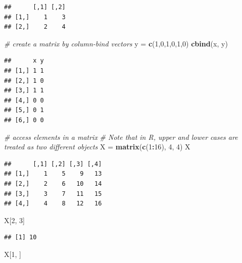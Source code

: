 \documentclass[
]{book}
\newenvironment{Shaded}{\begin{snugshade}}{\end{snugshade}}
\newcommand{\CommentTok}[1]{\textcolor[rgb]{0.56,0.35,0.01}{\textit{#1}}}
\newcommand{\DecValTok}[1]{\textcolor[rgb]{0.00,0.00,0.81}{#1}}
\newcommand{\KeywordTok}[1]{\textcolor[rgb]{0.13,0.29,0.53}{\textbf{#1}}}
\newcommand{\NormalTok}[1]{#1}
\newcommand{\OperatorTok}[1]{\textcolor[rgb]{0.81,0.36,0.00}{\textbf{#1}}}
\newcommand{\StringTok}[1]{\textcolor[rgb]{0.31,0.60,0.02}{#1}}
\begin{document}
\begin{verbatim}
##      [,1] [,2]
## [1,]    1    3
## [2,]    2    4
\end{verbatim}

\begin{Shaded}
\begin{Highlighting}[]
  \CommentTok{# create a matrix by column-bind vectors}
\NormalTok{  y =}\StringTok{ }\KeywordTok{c}\NormalTok{(}\DecValTok{1}\NormalTok{,}\DecValTok{0}\NormalTok{,}\DecValTok{1}\NormalTok{,}\DecValTok{0}\NormalTok{,}\DecValTok{1}\NormalTok{,}\DecValTok{0}\NormalTok{)}
  \KeywordTok{cbind}\NormalTok{(x, y)}
\end{Highlighting}
\end{Shaded}

\begin{verbatim}
##      x y
## [1,] 1 1
## [2,] 1 0
## [3,] 1 1
## [4,] 0 0
## [5,] 0 1
## [6,] 0 0
\end{verbatim}

\begin{Shaded}
\begin{Highlighting}[]
  \CommentTok{# access elements in a matrix}
  \CommentTok{# Note that in R, upper and lower cases are treated as two different objects}
\NormalTok{  X =}\StringTok{ }\KeywordTok{matrix}\NormalTok{(}\KeywordTok{c}\NormalTok{(}\DecValTok{1}\OperatorTok{:}\DecValTok{16}\NormalTok{), }\DecValTok{4}\NormalTok{, }\DecValTok{4}\NormalTok{)}
\NormalTok{  X}
\end{Highlighting}
\end{Shaded}

\begin{verbatim}
##      [,1] [,2] [,3] [,4]
## [1,]    1    5    9   13
## [2,]    2    6   10   14
## [3,]    3    7   11   15
## [4,]    4    8   12   16
\end{verbatim}

\begin{Shaded}
\begin{Highlighting}[]
\NormalTok{  X[}\DecValTok{2}\NormalTok{, }\DecValTok{3}\NormalTok{]}
\end{Highlighting}
\end{Shaded}

\begin{verbatim}
## [1] 10
\end{verbatim}

\begin{Shaded}
\begin{Highlighting}[]
\NormalTok{  X[}\DecValTok{1}\NormalTok{, ]}
\end{Highlighting}
\end{Shaded}
\end{document}
